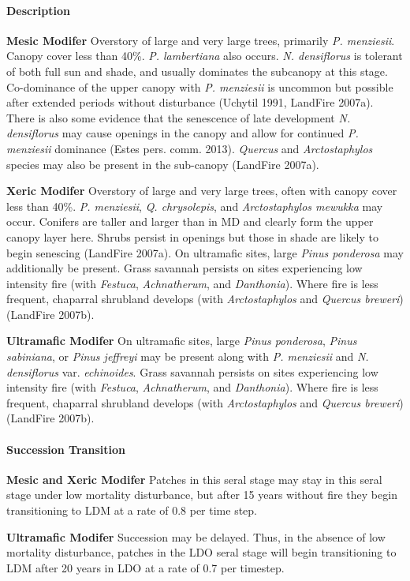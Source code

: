 \paragraph{Description}
\begin{adjustwidth}{2cm}{}
\textbf{Mesic Modifer } Overstory of large and very large trees, primarily \emph{P. menziesii}. Canopy cover less than 40\%. \emph{P. lambertiana} also occurs. \emph{N. densiflorus} is tolerant of both full sun and shade, and usually dominates the subcanopy at this stage. Co-dominance of the upper canopy with \emph{P. menziesii} is uncommon but possible after extended periods without disturbance (Uchytil 1991, LandFire 2007a). There is also some evidence that the senescence of late development \emph{N. densiflorus} may cause openings in the canopy and allow for continued \emph{P. menziesii} dominance (Estes pers. comm. 2013). \emph{Quercus} and \emph{Arctostaphylos} species may also be present in the sub-canopy (LandFire 2007a).

\medskip
\noindent \textbf{Xeric Modifer}  Overstory of large and very large trees, often with canopy cover less than 40\%. \emph{P. menziesii}, \emph{Q. chrysolepis}, and \emph{Arctostaphylos mewukka} may occur. Conifers are taller and larger than in MD and clearly form the upper canopy layer here. Shrubs persist in openings but those in shade are likely to begin senescing (LandFire 2007a). On ultramafic sites, large \emph{Pinus ponderosa} may additionally be present. Grass savannah persists on sites experiencing low intensity fire (with \emph{Festuca}, \emph{Achnatherum}, and \emph{Danthonia}). Where fire is less frequent, chaparral shrubland develops (with \emph{Arctostaphylos} and \emph{Quercus breweri}) (LandFire 2007b).

\medskip
\noindent \textbf{Ultramafic Modifer} On ultramafic sites, large \emph{Pinus ponderosa}, \emph{Pinus sabiniana}, or \emph{Pinus jeffreyi} may be present along with \emph{P. menziesii} and \emph{N. densiflorus} var. \emph{echinoides}. Grass savannah persists on sites experiencing low intensity fire (with \emph{Festuca}, \emph{Achnatherum}, and \emph{Danthonia}). Where fire is less frequent, chaparral shrubland develops (with \emph{Arctostaphylos} and \emph{Quercus breweri}) (LandFire 2007b).

\end{adjustwidth}
\paragraph{Succession Transition}
\begin{adjustwidth}{2cm}{}
\textbf{Mesic and Xeric Modifer } Patches in this seral stage may stay in this seral stage under low mortality disturbance, but after 15 years without fire they begin transitioning to LDM at a rate of 0.8 per time step. 

\medskip
\noindent \textbf{Ultramafic Modifer} Succession may be delayed. Thus, in the absence of low mortality disturbance, patches in the LDO seral stage will begin transitioning to LDM after 20 years in LDO at a rate of 0.7 per timestep. 

\end{adjustwidth}
